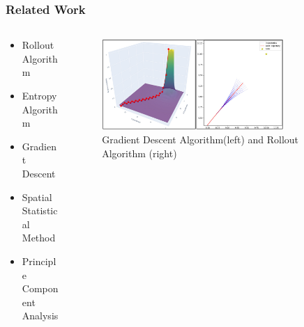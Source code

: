 \documentclass[aspectratio=169]{beamer}
\begin{document}
\begin{frame}
  \frametitle{Related Work}
  
  \begin{columns}
    \begin{column}{0.4\textwidth}
      \begin{itemize}
        \item Rollout Algorithm \cite{hoffmann2019rollout}%
        \item Entropy Algorithm \cite{zhu2020novel}%
        \item Gradient Descent \cite{wu2022convolutionally}%
        \item Spatial Statistical Method \cite{wan2012detection}
        \item Principle Component Analysis \cite{kishimoto2021path}
      \end{itemize}
    \end{column}
    \begin{column}{0.6\textwidth}
      \begin{figure}
        \centering
        \includegraphics[width=0.8\textwidth]{images/related_work.jpg}
        \caption{Gradient Descent Algorithm(left) and Rollout Algorithm (right)}
        \label{fig:Relevance}
      \end{figure}
    \end{column}
  \end{columns}
    
\end{frame}
\end{document}
